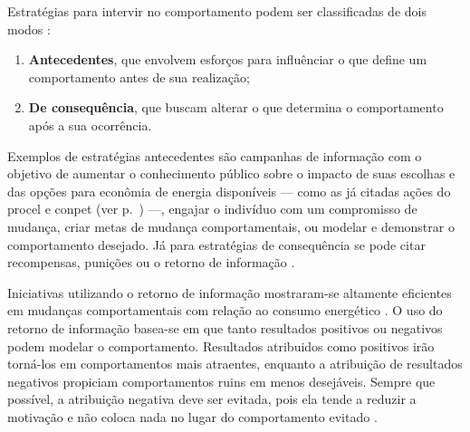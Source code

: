 Estratégias para intervir no comportamento podem ser classificadas de dois modos
\cite{aceee_2010_estudos_feedback,2009_epri}:
\begin{enumerate}
\item \textbf{Antecedentes}, que envolvem esforços para influênciar o que define 
um comportamento antes de sua realização; 
\item \textbf{De consequência}, que buscam alterar o que determina o 
comportamento após a sua ocorrência. 
\end{enumerate}

Exemplos de estratégias antecedentes são campanhas de informação 
com o objetivo de aumentar o conhecimento público sobre o impacto de suas 
escolhas e das opções para econômia de energia disponíveis --- como 
as já citadas ações do \gls{procel} e \gls{conpet} (ver p.~\pageref{text:prog_cepel}) ---,
engajar o indivíduo com um compromisso de mudança, criar metas de mudança
comportamentais, ou modelar e demonstrar o comportamento desejado. Já para
estratégias de consequência se pode citar recompensas, punições ou o
retorno de informação \cite{aceee_2010_estudos_feedback,2009_epri}. 

Iniciativas utilizando o retorno de informação mostraram-se altamente eficientes
em mudanças comportamentais com relação ao consumo energético \cite{
aceee_2010_estudos_feedback,2009_epri,2012_schleich__austria,
2011_zhifeng_smart_energy_savings,2006_darby,2009_nber_studies_us,
ucla_studies_1975_2011_usa,2010_nilm_melhorando_pph_usa_37}. O uso do
retorno de informação basea-se em que tanto resultados positivos ou
negativos podem modelar o comportamento. Resultados atribuidos como
positivos irão torná-los em comportamentos mais atraentes, enquanto a
atribuição de resultados negativos propiciam comportamentos ruins em
menos desejáveis. Sempre que possível, a atribuição negativa deve ser
evitada, pois ela tende a reduzir a motivação e não coloca nada no
lugar do comportamento evitado \cite{2010_aspectos_psicologicos_usa}.

